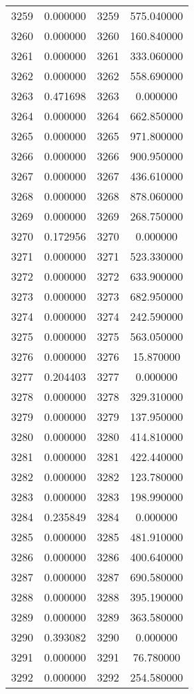 \documentclass[12pt]{article}
\begin{document}
\begin{longtable}{@{}cccc@{}}
3259 & 0.000000 & 3259 & 575.040000 \\
3260 & 0.000000 & 3260 & 160.840000 \\
3261 & 0.000000 & 3261 & 333.060000 \\
3262 & 0.000000 & 3262 & 558.690000 \\
3263 & 0.471698 & 3263 & 0.000000 \\
3264 & 0.000000 & 3264 & 662.850000 \\
3265 & 0.000000 & 3265 & 971.800000 \\
3266 & 0.000000 & 3266 & 900.950000 \\
3267 & 0.000000 & 3267 & 436.610000 \\
3268 & 0.000000 & 3268 & 878.060000 \\
3269 & 0.000000 & 3269 & 268.750000 \\
3270 & 0.172956 & 3270 & 0.000000 \\
3271 & 0.000000 & 3271 & 523.330000 \\
3272 & 0.000000 & 3272 & 633.900000 \\
3273 & 0.000000 & 3273 & 682.950000 \\
3274 & 0.000000 & 3274 & 242.590000 \\
3275 & 0.000000 & 3275 & 563.050000 \\
3276 & 0.000000 & 3276 & 15.870000 \\
3277 & 0.204403 & 3277 & 0.000000 \\
3278 & 0.000000 & 3278 & 329.310000 \\
3279 & 0.000000 & 3279 & 137.950000 \\
3280 & 0.000000 & 3280 & 414.810000 \\
3281 & 0.000000 & 3281 & 422.440000 \\
3282 & 0.000000 & 3282 & 123.780000 \\
3283 & 0.000000 & 3283 & 198.990000 \\
3284 & 0.235849 & 3284 & 0.000000 \\
3285 & 0.000000 & 3285 & 481.910000 \\
3286 & 0.000000 & 3286 & 400.640000 \\
3287 & 0.000000 & 3287 & 690.580000 \\
3288 & 0.000000 & 3288 & 395.190000 \\
3289 & 0.000000 & 3289 & 363.580000 \\
3290 & 0.393082 & 3290 & 0.000000 \\
3291 & 0.000000 & 3291 & 76.780000 \\
3292 & 0.000000 & 3292 & 254.580000 \\

\end{longtable}
\end{document}
